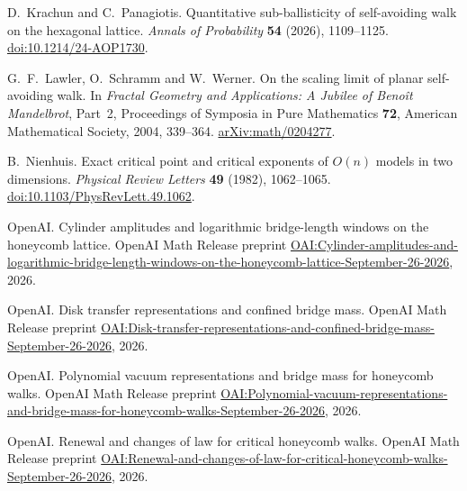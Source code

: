 D.~Krachun and C.~Panagiotis.
Quantitative sub-ballisticity of self-avoiding walk on the hexagonal lattice.
\emph{Annals of Probability} \textbf{54} (2026), 1109--1125.
\href{https://doi.org/10.1214/24-AOP1730}{doi:10.1214/24-AOP1730}.

G.~F.~Lawler, O.~Schramm and W.~Werner.
On the scaling limit of planar self-avoiding walk.
In \emph{Fractal Geometry and Applications: A Jubilee of Beno\^it Mandelbrot},
Part~2, Proceedings of Symposia in Pure Mathematics \textbf{72},
American Mathematical Society, 2004, 339--364.
\href{https://arxiv.org/abs/math/0204277}{arXiv:math/0204277}.

B.~Nienhuis.
Exact critical point and critical exponents of $O(n)$ models in two dimensions.
\emph{Physical Review Letters} \textbf{49} (1982), 1062--1065.
\href{https://doi.org/10.1103/PhysRevLett.49.1062}{doi:10.1103/PhysRevLett.49.1062}.

OpenAI.
Cylinder amplitudes and logarithmic bridge-length windows on the honeycomb lattice.
OpenAI Math Release preprint
\href{https://github.com/openai/math/blob/main/preprints/Cylinder-amplitudes-and-logarithmic-bridge-length-windows-on-the-honeycomb-lattice-September-26-2026/main.pdf}{OAI:Cylinder-amplitudes-and-logarithmic-bridge-length-windows-on-the-honeycomb-lattice-September-26-2026},
2026.

OpenAI.
Disk transfer representations and confined bridge mass.
OpenAI Math Release preprint
\href{https://github.com/openai/math/blob/main/preprints/Disk-transfer-representations-and-confined-bridge-mass-September-26-2026/main.pdf}{OAI:Disk-transfer-representations-and-confined-bridge-mass-September-26-2026},
2026.

OpenAI.
Polynomial vacuum representations and bridge mass for honeycomb walks.
OpenAI Math Release preprint
\href{https://github.com/openai/math/blob/main/preprints/Polynomial-vacuum-representations-and-bridge-mass-for-honeycomb-walks-September-26-2026/main.pdf}{OAI:Polynomial-vacuum-representations-and-bridge-mass-for-honeycomb-walks-September-26-2026},
2026.

OpenAI.
Renewal and changes of law for critical honeycomb walks.
OpenAI Math Release preprint
\href{https://github.com/openai/math/blob/main/preprints/Renewal-and-changes-of-law-for-critical-honeycomb-walks-September-26-2026/main.pdf}{OAI:Renewal-and-changes-of-law-for-critical-honeycomb-walks-September-26-2026},
2026.

